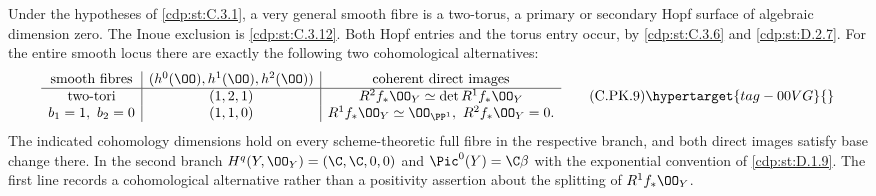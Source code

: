 \begin{proposition}\hypertarget{tag-01F6}{}\label{cdp:st:C.3.11}



Under the hypotheses of \ref{cdp:st:C.3.1}, a very general smooth fibre
is a two-torus, a primary or secondary Hopf surface of
algebraic dimension zero. The Inoue exclusion is \ref{cdp:st:C.3.12}.
Both Hopf
entries and the torus entry occur, by \ref{cdp:st:C.3.6} and \ref{cdp:st:D.2.7}.
For the entire smooth locus there are exactly the following
two cohomological alternatives:
\[
\begin{array}{c|c|c}
\text{smooth fibres}&
 (h^0(\OO),h^1(\OO),h^2(\OO))&
 \text{coherent direct images}\\ \hline
\text{two-tori}&(1,2,1)&
 R^2f_*\OO_Y\simeq\det R^1f_*\OO_Y\\
b_1=1,\ b_2=0&(1,1,0)&
 R^1f_*\OO_Y\simeq\OO_{\PP^1},\
 R^2f_*\OO_Y=0 .
\end{array}
\tag{C.PK.9}\hypertarget{tag-00VG}{}\label{cdp:eq:C.PK.9}
\]
The indicated cohomology dimensions hold on every
scheme-theoretic full fibre in the respective branch,
and both direct images satisfy base change there.
In the second branch
$H^q(Y,\OO_Y)=(\C,\C,0,0)$ and
$\Pic^0(Y)=\C\beta$ with the exponential convention
of \ref{cdp:st:D.1.9}. The first line records a cohomological
alternative rather than a positivity assertion about
the splitting of $R^1f_*\OO_Y$.
\end{proposition}
